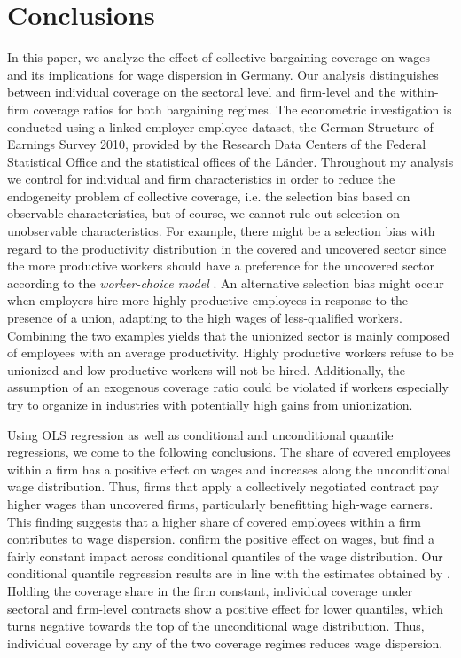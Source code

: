 \section{Conclusions}\label{Sec:Conc}
In this paper, we analyze the effect of collective bargaining coverage on wages and its implications for wage dispersion in Germany. Our analysis distinguishes between individual coverage on the sectoral level and firm-level and the within-firm coverage ratios for both bargaining regimes. The econometric investigation is conducted using a linked employer-employee dataset, the German Structure of Earnings Survey 2010, provided by the Research Data Centers of the Federal Statistical Office and the statistical offices of the L\"ander. Throughout my analysis we control for individual and firm characteristics in order to reduce the endogeneity problem of collective coverage, i.e. the selection bias based on observable characteristics, but of course, we cannot rule out selection on unobservable characteristics. For example, there might be a selection bias with regard to the productivity distribution in the covered and uncovered sector since the more productive workers should have a preference for the uncovered sector according to the \emph{worker-choice model} \citep{Lee:78}. An alternative selection bias might occur when employers hire more highly productive employees in response to the presence of a union, adapting to the high wages of less-qualified workers. Combining the two examples yields that the unionized sector is mainly composed of employees with an average productivity. Highly productive workers refuse to be unionized and low productive workers will not be hired. Additionally, the assumption of an exogenous coverage ratio could be violated if workers especially try to organize in industries with potentially high gains from unionization. 

Using OLS regression as well as conditional and unconditional quantile regressions, we come to the following conclusions. The share of covered employees within a firm has a positive effect on wages and increases along the unconditional wage distribution. Thus, firms that apply a collectively negotiated contract pay higher wages than uncovered firms, particularly benefitting high-wage earners. This finding suggests that a higher share of covered employees within a firm contributes to wage dispersion. \cite{Fitzenberger&Kohn&Lembcke:13} confirm the positive effect on wages, but find a fairly constant impact across conditional quantiles of the wage distribution. Our conditional quantile regression results are in line with the estimates obtained by \cite{Fitzenberger&Kohn&Lembcke:13}. Holding the coverage share in the firm constant, individual coverage under sectoral and firm-level contracts show a positive effect for lower quantiles, which turns negative towards the top of the unconditional wage distribution. Thus, individual coverage by any of the two coverage regimes reduces wage dispersion.

